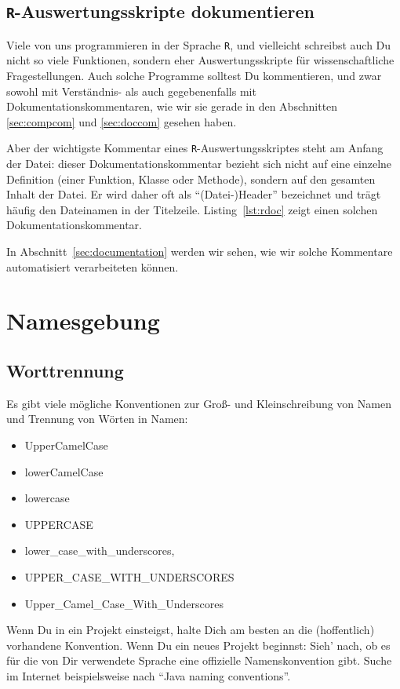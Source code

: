 \documentclass[twoside]{scrreprt}
\providecommand{\R}{\texttt{R}}
\begin{document}
\subsection{\R{}-Auswertungsskripte dokumentieren
\label{sec:rdoc}
}
Viele von uns programmieren in der Sprache \R{}, und vielleicht schreibst 
auch Du nicht so viele Funktionen, sondern eher Auswertungsskripte f\"u{}r 
wissenschaftliche Fragestellungen. 
Auch solche Programme solltest Du kommentieren, und zwar sowohl mit 
Verst\"a{}ndnis- als auch gegebenenfalls mit  Dokumentationskommentaren, wie wir
sie gerade in den Abschnitten \ref{sec:compcom} und \ref{sec:doccom} gesehen 
haben.

Aber der wichtigste Kommentar eines \R{}-Auswertungsskriptes steht  
am Anfang der Datei: dieser Dokumentationskommentar bezieht sich nicht auf eine
einzelne Definition (einer Funktion, Klasse oder Methode), sondern auf den 
gesamten Inhalt der
Datei. Er wird daher oft als "`(Datei-)Header"' bezeichnet und tr\"a{}gt
h\"a{}ufig den Dateinamen in der Titelzeile.
Listing~\ref{lst:rdoc} zeigt einen solchen Dokumentationskommentar. 

 
In Abschnitt~\ref{sec:documentation} werden wir sehen, wie wir solche
Kommentare automatisiert verarbeiteten k\"o{}nnen.


\section{Namesgebung\label{sec:naming}}
\subsection{Worttrennung}
Es gibt viele m\"o{}gliche Konventionen zur Gro\ss{}- und Kleinschreibung  von
Namen und
Trennung von W\"o{}rten in Namen:
\begin{itemize}
\item UpperCamelCase
\item lowerCamelCase
\item lowercase
\item UPPERCASE
\item lower\_case\_with\_underscores,
\item UPPER\_CASE\_WITH\_UNDERSCORES
\item Upper\_Camel\_Case\_With\_Underscores
\end{itemize}
Wenn Du in ein Projekt einsteigst, halte Dich am besten an die (hoffentlich)
vorhandene Konvention.
Wenn Du ein neues Projekt beginnst: Sieh' nach, ob es f\"u{}r die von Dir 
verwendete Sprache eine offizielle Namenskonvention gibt. Suche im Internet 
beispielsweise nach "`Java naming conventions"'.
\end{document}
